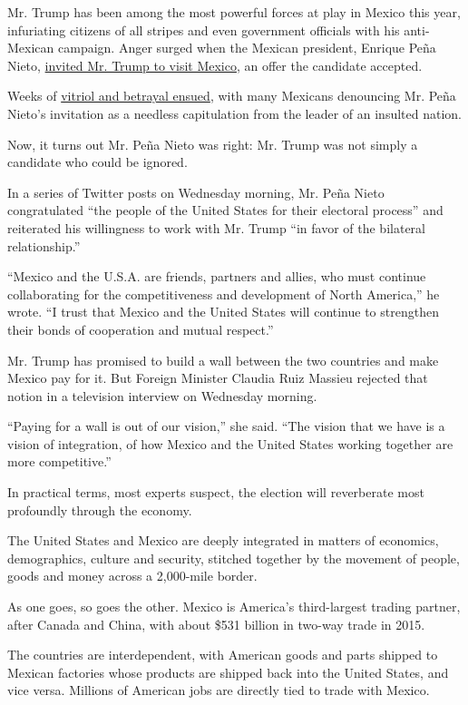 Mr. Trump has been among the most powerful forces at play in Mexico this
year, infuriating citizens of all stripes and even government officials
with his anti-Mexican campaign. Anger surged when the Mexican president,
Enrique Peña Nieto,
\href{http://www.nytimes3xbfgragh.onion/2016/09/01/world/americas/trump-mexico-pena-nieto-reaction.html}{invited
Mr. Trump to visit Mexico}, an offer the candidate accepted.

Weeks of
\href{http://www.nytimes3xbfgragh.onion/2016/09/08/world/americas/mexico-finance-minister-luis-videgaray-resigns.html}{vitriol
and betrayal ensued}, with many Mexicans denouncing Mr. Peña Nieto's
invitation as a needless capitulation from the leader of an insulted
nation.

Now, it turns out Mr. Peña Nieto was right: Mr. Trump was not simply a
candidate who could be ignored.

In a series of Twitter posts on Wednesday morning, Mr. Peña Nieto
congratulated ``the people of the United States for their electoral
process'' and reiterated his willingness to work with Mr. Trump ``in
favor of the bilateral relationship.''

``Mexico and the U.S.A. are friends, partners and allies, who must
continue collaborating for the competitiveness and development of North
America,'' he wrote. ``I trust that Mexico and the United States will
continue to strengthen their bonds of cooperation and mutual respect.''

Mr. Trump has promised to build a wall between the two countries and
make Mexico pay for it. But Foreign Minister Claudia Ruiz Massieu
rejected that notion in a television interview on Wednesday morning.

``Paying for a wall is out of our vision,'' she said. ``The vision that
we have is a vision of integration, of how Mexico and the United States
working together are more competitive.''

In practical terms, most experts suspect, the election will reverberate
most profoundly through the economy.

The United States and Mexico are deeply integrated in matters of
economics, demographics, culture and security, stitched together by the
movement of people, goods and money across a 2,000-mile border.

As one goes, so goes the other. Mexico is America's third-largest
trading partner, after Canada and China, with about \$531 billion in
two-way trade in 2015.

The countries are interdependent, with American goods and parts shipped
to Mexican factories whose products are shipped back into the United
States, and vice versa. Millions of American jobs are directly tied to
trade with Mexico.

